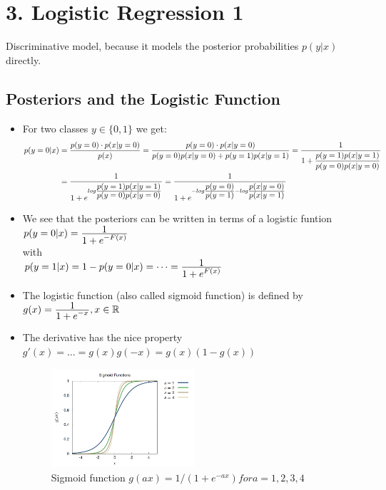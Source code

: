 \section*{3. Logistic Regression 1}
Discriminative model, because it models the posterior probabilities $p(y|x)$ directly.         

\subsection*{Posteriors and the Logistic Function}
\begin{itemize}
    \item
        For two classes $y \in \{0,1\}$ we get:\\
        \begin{align*}
        p(y=0|x) &= \frac{\displaystyle p(y=0) \cdot p(x|y=0)}{\displaystyle p(x)} 
        = \frac{\displaystyle p(y=0) \cdot p(x|y=0)}{\displaystyle p(y=0)p(x|y=0) + p(y=1)p(x|y=1)} 
        = \frac{\displaystyle 1}{\displaystyle 1+ \frac{\displaystyle p(y=1)p(x|y=1)}{\displaystyle p(y=0)p(x|y=0)}}\\
        &= \frac{\displaystyle 1}{\displaystyle 1+ e^{log\frac{\displaystyle p(y=1)p(x|y=1)}{\displaystyle p(y=0)p(x|y=0)}}}
        = \frac{\displaystyle 1}{\displaystyle 1+ e^{-log\frac{\displaystyle p(y=0)}{\displaystyle p(y=1)} - log\frac{\displaystyle p(x|y=0)}{\displaystyle p(x|y=1)}}}
        \end{align*}
    \item
        We see that the posteriors can be written in terms of a logistic funtion\\
        $p(y=0|x) = \frac{\displaystyle 1}{\displaystyle 1+e^{-F(x)}}$\\
        with\\
        $p(y=1|x) = 1-p(y=0|x) = \dots = \frac{\displaystyle 1}{\displaystyle 1+e^{F(x)}}$
    \item
        The logistic function (also called sigmoid function) is defined by
        $g(x) = \frac{\displaystyle 1}{\displaystyle 1+e^{-x}}, x \in \mathbb{R}$
    \item
        The derivative has the nice property $g'(x) = \dots = g(x)g(-x) = g(x)(1-g(x))$
        \begin{figure}[H]
            \centering
            \includegraphics[width=0.5\textwidth]{figures/pr03_3-8}
            \caption{Sigmoid function $g(ax) = 1/(1 + e^{-ax}) for a = 1,2,3,4$}
        \end{figure}
\end{itemize}
